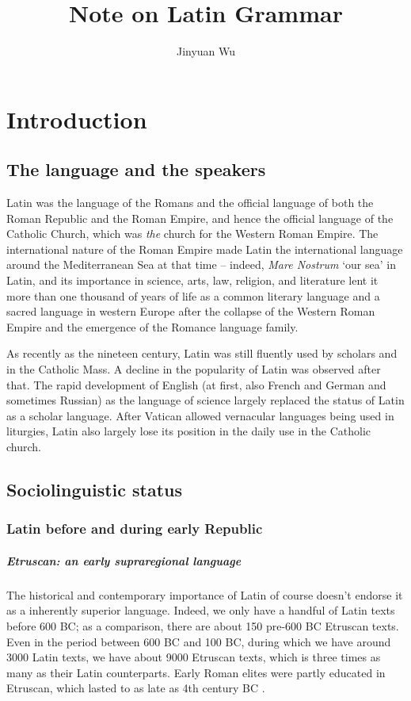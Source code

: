 \documentclass[a4paper, oneside, 12pt]{report}
\title{Note on Latin Grammar}
\author{Jinyuan Wu}
\newcommand*{\citepage}[1]{p.~{#1}}
\newcommand{\form}[1]{\emph{#1}}
\newcommand{\translate}[1]{`#1'}
\begin{document}
\automath

\maketitle

\chapter{Introduction}

\section{The language and the speakers}

Latin was the language of the Romans
and the official language of both the Roman Republic and the Roman Empire,
and hence the official language of the Catholic Church, 
which was \emph{the} church for the Western Roman Empire. 
The international nature of the Roman Empire made Latin 
the international language around the Mediterranean Sea at that time -- 
indeed, \form{Mare Nostrum} \translate{our sea} in Latin,
and its importance in science, arts, law, religion, and literature 
lent it more than one thousand of years of life 
as a common literary language and a sacred language in western Europe
after the collapse of the Western Roman Empire 
and the emergence of the Romance language family.

As recently as the nineteen century,
Latin was still fluently used by scholars and in the Catholic Mass. 
A decline in the popularity of Latin was observed after that.
The rapid development of English (at first, also French and German and sometimes Russian)
as the language of science 
largely replaced the status of Latin as a scholar language.
After Vatican allowed vernacular languages being used in liturgies, 
Latin also largely lose its position in the daily use in the Catholic church. 

\section{Sociolinguistic status}

\subsection{Latin before and during early Republic}

\paragraph*{Etruscan: an early supraregional language}
The historical and contemporary importance of Latin 
of course doesn't endorse it as a inherently superior language. 
Indeed, we only have a handful of Latin texts before 600 BC; 
as a comparison, there are about 150 pre-600 BC Etruscan texts.
Even in the period between 600 BC and 100 BC, 
during which we have around 3000 Latin texts,
we have about 9000 Etruscan texts, 
which is three times as many as their Latin counterparts. 
Early Roman elites were partly educated in Etruscan,
which lasted to as late as 4th century BC \citep[\citepage{43}]{leonhardt2013latin}.
\end{document}

